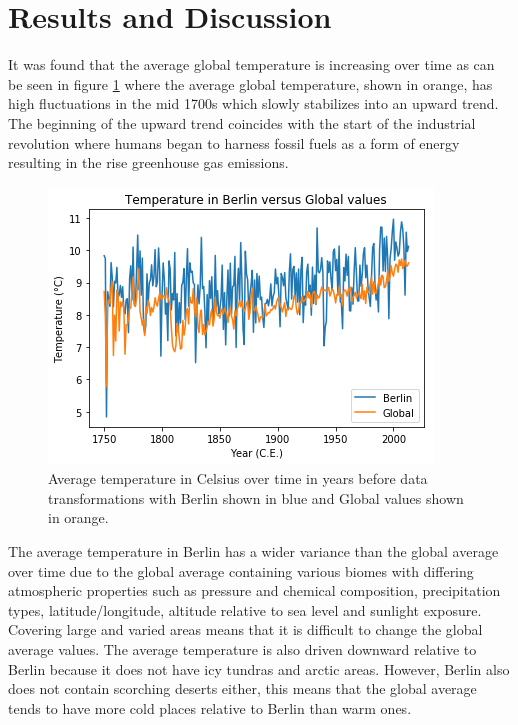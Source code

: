 \documentclass[journal, a4paper]{IEEEtran}
\begin{document}
\section{Results and Discussion}

	It was found that the average global temperature is increasing over time as can be seen in figure \ref{fig1} where the average global temperature, shown in orange, has high fluctuations in the mid 1700s which slowly stabilizes into an upward trend. The beginning of the upward trend coincides with the start of the industrial revolution where humans began to harness fossil fuels as a form of energy resulting in the rise greenhouse gas emissions.\\
    
	\begin{figure}[tbh]
		\begin{center}
		\includegraphics[width=\columnwidth]{AverageTemperaturePlot.png}
		\caption{Average temperature in Celsius over time in years before data transformations with Berlin shown in blue and Global values shown in orange.}
		\label{fig1}
		\end{center}
	\end{figure}
    
    The average temperature in Berlin has a wider variance than the global average over time due to the global average containing various biomes with differing atmospheric properties such as pressure and chemical composition, precipitation types, latitude/longitude, altitude relative to sea level and sunlight exposure. Covering large and varied areas means that it is difficult to change the global average values. The average temperature is also driven downward relative to Berlin because it does not have icy tundras and arctic areas. However, Berlin also does not contain scorching deserts either, this means that the global average tends to have more cold places relative to Berlin than warm ones.\\
    
\end{document}
